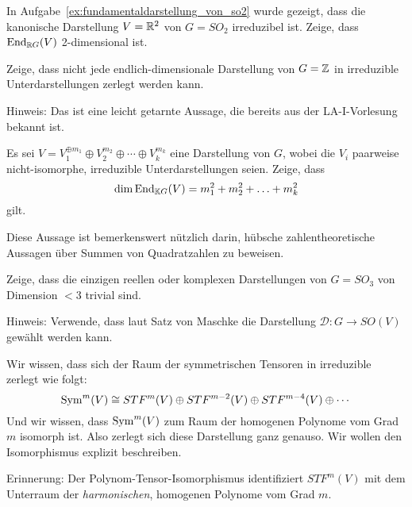 \begin{sheet}

\begin{problem}[title={Satz von Schur über Körpern $\neq\IC$}]
In Aufgabe~\ref{ex:fundamentaldarstellung_von_so2} wurde gezeigt, dass die kanonische Darstellung $V=\mathbb{R}^2$ von $G=SO_2$ irreduzibel ist. Zeige, dass $\operatorname{End}_{\mathbb{R} G}(V)$ 2-dimensional ist.
\end{problem}

\begin{problem}[title={Der Satz von Maschke ist falsch für nichtkompakte Gruppen}, difficulty={leichter als es aussieht}]
Zeige, dass nicht jede endlich-dimensionale Darstellung von $G=\mathbb{Z}$ in irreduzible Unterdarstellungen zerlegt werden kann.

Hinweis: Das ist eine leicht getarnte Aussage, die bereits aus der LA-I-Vorlesung bekannt ist.
\end{problem}


\begin{problem}[title={Dimension von Endomorphismenräumen}]
Es sei $V = V_1^{\oplus m_1} \oplus V_2^{m_2} \oplus \cdots \oplus V_k^{m_k}$ eine Darstellung von $G$, wobei die $V_i$ paarweise nicht-isomorphe, irreduzible Unterdarstellungen seien. Zeige, dass
\[\dim \operatorname{End}_{\mathbb{K} G}(V) = m_1^2 + m_2^2 + \ldots + m_k^2\]
gilt.
\end{problem}

\begin{remark}
Diese Aussage ist bemerkenswert nützlich darin, hübsche zahlentheoretische Aussagen über Summen von Quadratzahlen zu beweisen.
\end{remark}

\begin{problem}[title={2D-Darstellungen von $SO_3$}]
	\label{ex:keine_2D_darstellung_von_so3}
Zeige, dass die einzigen reellen oder komplexen Darstellungen von $G=SO_3$ von Dimension $<3$ trivial sind.

Hinweis: Verwende, dass laut Satz von Maschke die Darstellung $\mathcal{D}: G\to SO(V)$ gewählt werden kann.
\end{problem}

\begin{problem}[title={Isomorphismus zwischen irreduziblen Darstellungen von Polynomen und Tensoren}]
Wir wissen, dass sich der Raum der symmetrischen Tensoren in irreduzible zerlegt wie folgt:
\[\operatorname{Sym}^m(V) \cong STF^m(V) \oplus STF^{m-2}(V) \oplus STF^{m-4}(V) \oplus \cdots\]
Und wir wissen, dass $\operatorname{Sym}^m(V)$ zum Raum der homogenen Polynome vom Grad $m$ isomorph ist. Also zerlegt sich diese Darstellung ganz genauso. Wir wollen den Isomorphismus explizit beschreiben.
\begin{subproblem}
Erinnerung: Der Polynom-Tensor-Isomorphismus identifiziert $STF^m(V)$ mit dem Unterraum der \emph{harmonischen}, homogenen Polynome vom Grad $m$.


\end{subproblem}
\end{problem}
\end{sheet}
